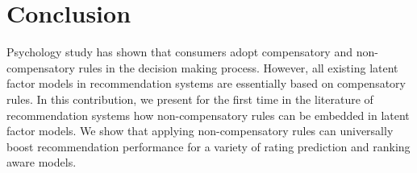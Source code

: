 \documentclass[letterpaper]{article} %
\begin{document}
\section{Conclusion}\label{sec:conclusion}
Psychology study has shown that consumers adopt compensatory and non-compensatory rules in the decision making process. However, all existing latent factor models in recommendation systems are essentially based on compensatory rules. In this contribution, we present for the first time in the literature of recommendation systems how non-compensatory rules can be embedded in latent factor models. We show that applying non-compensatory rules can universally boost recommendation performance for a variety of rating prediction and ranking aware models. 



\end{document}
